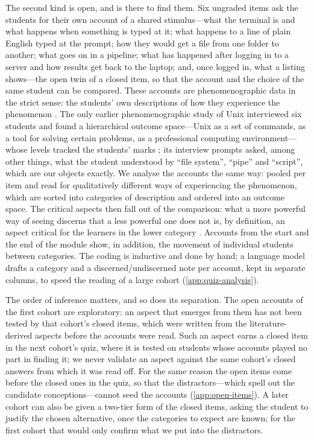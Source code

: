 The second kind is open, and is there to find them.
Six ungraded items ask the students for their own account of a shared
stimulus---what the terminal is and what happens when something is
typed at it; what happens to a line of plain English typed at the
prompt; how they would get a file from one folder to another; what goes
on in a pipeline; what has happened after logging in to a server and how
results get back to the laptop; and, once logged in, what a listing
shows---the open twin of a closed item, so that the account and the
choice of the same student can be compared.
These accounts are phenomenographic data in the strict sense: the
students' own descriptions of how they experience the phenomenon
\autocite{Phenomenography}.
The only earlier phenomenographic study of Unix interviewed six students
and found a hierarchical outcome space---Unix as a set of commands, as a
tool for solving certain problems, as a professional computing
environment---whose levels tracked the students' marks
\autocite{DoyleLister2006Unix}; its interview prompts asked, among other
things, what the student understood by \enquote{file system},
\enquote{pipe} and \enquote{script}, which are our objects exactly.
We analyse the accounts the same way: pooled per item and read for
qualitatively different ways of experiencing the phenomenon, which are
sorted into categories of description and ordered into an outcome space.
The critical aspects then fall out of the comparison: what a more
powerful way of seeing discerns that a less powerful one does not is,
by definition, an aspect critical for the learners in the lower category
\autocite[Ch.~2]{NCOL}.
Accounts from the start and the end of the module show, in addition,
the movement of individual students between categories.
The coding is inductive and done by hand; a language model drafts a
category and a discerned/undiscerned note per account, kept in separate
columns, to speed the reading of a large cohort (\cref{app:quiz-analysis}).

The order of inference matters, and so does its separation.
The open accounts of the first cohort are exploratory: an aspect that
emerges from them has not been tested by that cohort's closed items,
which were written from the literature-derived aspects before the
accounts were read.
Such an aspect earns a closed item in the next cohort's quiz, where it
is tested on students whose accounts played no part in finding it; we
never validate an aspect against the same cohort's closed answers from
which it was read off.
For the same reason the open items come before the closed ones in the
quiz, so that the distractors---which spell out the candidate
conceptions---cannot seed the accounts (\cref{app:open-items}).
A later cohort can also be given a two-tier form of the closed items,
asking the student to justify the chosen alternative, once the categories
to expect are known; for the first cohort that would only confirm what
we put into the distractors.

